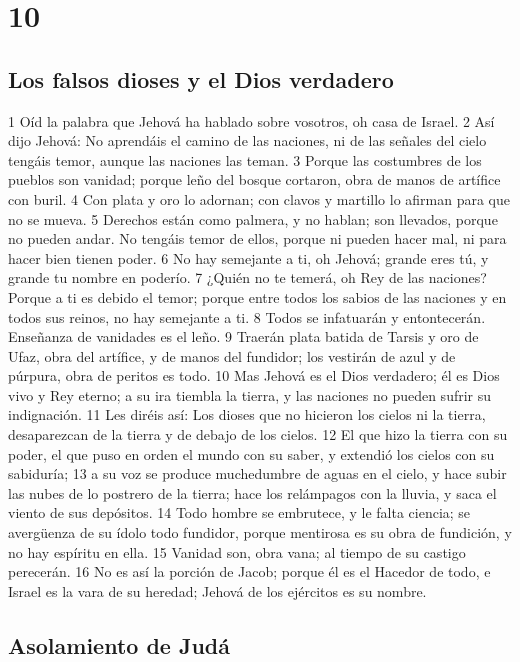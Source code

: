 \chapter{10}

\section*{Los falsos dioses y el Dios verdadero}

1 Oíd la palabra que Jehová ha hablado sobre vosotros, oh casa de Israel.
2 Así dijo Jehová: No aprendáis el camino de las naciones, ni de las señales del cielo tengáis temor, aunque las naciones las teman.
3 Porque las costumbres de los pueblos son vanidad; porque leño del bosque cortaron, obra de manos de artífice con buril.
4 Con plata y oro lo adornan; con clavos y martillo lo afirman para que no se mueva.
5 Derechos están como palmera, y no hablan; son llevados, porque no pueden andar. No tengáis temor de ellos, porque ni pueden hacer mal, ni para hacer bien tienen poder.
6 No hay semejante a ti, oh Jehová; grande eres tú, y grande tu nombre en poderío.
7 ¿Quién no te temerá, oh Rey de las naciones? Porque a ti es debido el temor; porque entre todos los sabios de las naciones y en todos sus reinos, no hay semejante a ti.
8 Todos se infatuarán y entontecerán. Enseñanza de vanidades es el leño.
9 Traerán plata batida de Tarsis y oro de Ufaz, obra del artífice, y de manos del fundidor; los vestirán de azul y de púrpura, obra de peritos es todo.
10 Mas Jehová es el Dios verdadero; él es Dios vivo y Rey eterno; a su ira tiembla la tierra, y las naciones no pueden sufrir su indignación.
11 Les diréis así: Los dioses que no hicieron los cielos ni la tierra, desaparezcan de la tierra y de debajo de los cielos.
12 El que hizo la tierra con su poder, el que puso en orden el mundo con su saber, y extendió los cielos con su sabiduría;
13 a su voz se produce muchedumbre de aguas en el cielo, y hace subir las nubes de lo postrero de la tierra; hace los relámpagos con la lluvia, y saca el viento de sus depósitos.
14 Todo hombre se embrutece, y le falta ciencia; se avergüenza de su ídolo todo fundidor, porque mentirosa es su obra de fundición, y no hay espíritu en ella.
15 Vanidad son, obra vana; al tiempo de su castigo perecerán.
16 No es así la porción de Jacob; porque él es el Hacedor de todo, e Israel es la vara de su heredad; Jehová de los ejércitos es su nombre.

\section*{Asolamiento de Judá}

